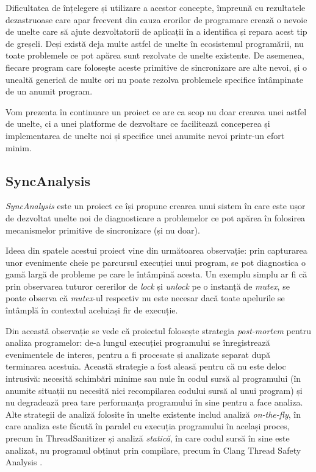 Dificultatea de înțelegere și utilizare a acestor concepte, împreună cu
rezultatele dezastruoase care apar frecvent din cauza erorilor de
programare crează o nevoie de unelte care să ajute dezvoltatorii de
aplicații în a identifica și repara acest tip de greșeli. Deși există
deja multe astfel de unelte în ecosistemul programării, nu toate
problemele ce pot apărea sunt rezolvate de unelte existente. De
asemenea, fiecare program care folosește aceste primitive de
sincronizare are alte nevoi, și o unealtă generică de multe ori nu poate
rezolva problemele specifice întâmpinate de un anumit program.

Vom prezenta în continuare un proiect ce are ca scop nu doar crearea
unei astfel de unelte, ci a unei platforme de dezvoltare ce facilitează
conceperea și implementarea de unelte noi și specifice unei anumite
nevoi printr-un efort minim.

\subsection{SyncAnalysis}
\textit{SyncAnalysis} este un proiect ce își propune crearea unui sistem
în care este ușor de dezvoltat unelte noi de diagnosticare a problemelor
ce pot apărea în folosirea mecanismelor primitive de sincronizare (și nu
doar).

Ideea din spatele acestui proiect vine din următoarea observație:
prin capturarea unor evenimente cheie pe parcursul execuției unui
program, se pot diagnostica o gamă largă de probleme pe care le
întâmpină acesta. Un exemplu simplu ar fi că prin observarea tuturor
cererilor de \textit{lock} și \textit{unlock} pe o instanță de
\textit{mutex}, se poate observa că \textit{mutex}-ul respectiv nu este
necesar dacă toate apelurile se întâmplă în contextul aceluiași fir de
execuție.

Din această observație se vede că proiectul folosește strategia
\textit{post-mortem} pentru analiza programelor: de-a lungul execuției
programului se înregistrează evenimentele de interes, pentru a fi
procesate și analizate separat după terminarea acestuia. Această
strategie a fost aleasă pentru că nu este deloc intrusivă: necesită
schimbări minime sau nule în codul sursă al programului (în anumite
situații nu necesită nici recompilarea codului sursă al unui
program) și nu degradează prea tare performanța programului în sine
pentru a face analiza. Alte strategii de analiză folosite în unelte
existente includ analiză \textit{on-the-fly}, în care analiza este
făcută în paralel cu execuția programului în același proces, precum în
ThreadSanitizer\cite{ThreadSanitizer} și analiză \textit{statică}, în
care codul sursă în sine este analizat, nu programul obținut prin
compilare, precum în Clang Thread Safety Analysis
\cite{ClangThreadSafetyAnalysis}.

